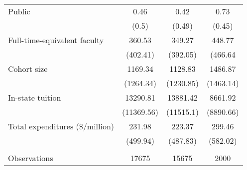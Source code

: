 \documentclass[8pt]{article}
\begin{document}
\begin{table}[htbp]
\begin{tabular}{l c c c}
 Public
 & 0.46 & 0.42 & 0.73\\
 & (0.5) & (0.49) & (0.45)\\
 
 Full-time-equivalent faculty
 & 360.53 & 349.27& 448.77\\
 & (402.41) & (392.05) & (466.64\\
 
 Cohort size 
 & 1169.34 & 1128.83 & 1486.87\\
 & (1264.34) & (1230.85) & (1463.14)\\
 
 In-state tuition
 & 13290.81 & 13881.42 & 8661.92\\
 & (11369.56) & (11515.1) & (8890.66)\\
 
 Total expenditures (\$/million)
 & 231.98 & 223.37 & 299.46\\
 & (499.94) & (487.83) & (582.02)\\
 &&&\\
 
 Observations & 17675 & 15675 & 2000 \\ \hline
 \end{tabular}
\end{table}
\end{document}
